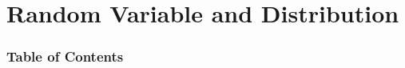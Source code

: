 \documentclass{beamer}
\begin{document}





\section{Random Variable and Distribution}
\begin{frame}
    \frametitle{Table of Contents}
    \tableofcontents[currentsection]
\end{frame}
\end{document}
